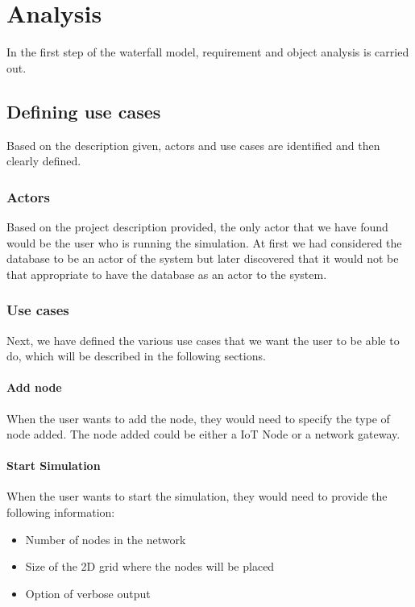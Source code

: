 \chapter{Analysis}\label{ch:Analysis}

In the first step of the waterfall model, requirement and object analysis is carried out.

\section{Defining use cases}
Based on the description given, actors and use cases are identified and then clearly defined.

\subsection{Actors}
Based on the project description provided, the only actor that we have found would be the user who is running the simulation. At first we had considered the database to be an actor of the system but later discovered that it would not be that appropriate to have the database as an actor to the system.

\subsection{Use cases}
Next, we have defined the various use cases that we want the user to be able to do, which will be described in the following sections.

\subsubsection{Add node}
When the user wants to add the node, they would need to specify the type of node added. The node added could be either a IoT Node or a network gateway.

\subsubsection{Start Simulation}
When the user wants to start the simulation, they would need to provide the following information:
\begin{itemize}
    \item Number of nodes in the network 
    \item Size of the 2D grid where the nodes will be placed
    \item Option of verbose output
\end{itemize}

